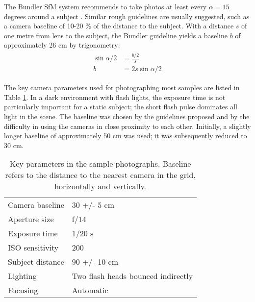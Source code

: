 

The Bundler SfM system recommends to take photos at least every $\alpha = 15$ degrees around a subject \cite{bundlerfaq}.
Similar rough guidelines are usually suggested, such as a camera baseline of 10-20 \% of the distance to the subject.
With a distance $s$ of one metre from lens to the subject, the Bundler guideline yields a baseline $b$ of approximately 26 cm by trigonometry: %
\begin{align} \begin{split} \label{eq:baselinedegrees}
	\sin \alpha/2 &= \frac{b/2}{s}\\
	b &= 2 s \sin \alpha/2
\end{split} \end{align}

The key camera parameters used for photographing most samples are listed in Table \ref{tab:sampleshotparams}.
In a dark environment with flash lights, the exposure time is not particularly important for a static subject; the short flash pulse dominates all light in the scene.
The baseline was chosen by the guidelines proposed and by the difficulty in using the cameras in close proximity to each other.
Initially, a slightly longer baseline of approximately 50 cm was used; it was subsequently reduced to 30 cm.

\begin{table}[t]
	\centering
	\begin{tabular}{l l}
		Camera baseline & 30 +/- 5 cm\\
		Aperture size & f/14\\
		Exposure time & 1/20 s\\
		ISO sensitivity & 200\\
		Subject distance & 90 +/- 10 cm\\
		Lighting & Two flash heads bounced indirectly\\
		Focusing & Automatic\\
	\end{tabular}
	\caption{
		Key parameters in the sample photographs.
		Baseline refers to the distance to the nearest camera in the grid, horizontally and vertically.
	}
	\label{tab:sampleshotparams}
\end{table}

